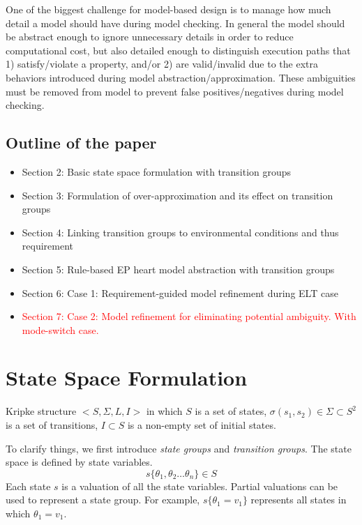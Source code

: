 \documentclass{llncs}
\begin{document}

One of the biggest challenge for model-based design is to manage how much detail a model should have during model checking. In general the model should be abstract enough to ignore unnecessary details in order to reduce computational cost, but also detailed enough to distinguish execution paths that 1) satisfy/violate a property, and/or 2) are valid/invalid due to the extra behaviors introduced during model abstraction/approximation. These ambiguities must be removed from model to prevent false positives/negatives during model checking. 

\subsection{Outline of the paper}
\begin{itemize}
	\item Section 2: Basic state space formulation with transition groups
    \item Section 3: Formulation of over-approximation and its effect on transition groups
    \item Section 4: Linking transition groups to environmental conditions and thus requirement
    \item Section 5: Rule-based EP heart model abstraction with transition groups
    \item Section 6: Case 1: Requirement-guided model refinement during ELT case 
    \item\textcolor{red}{ Section 7: Case 2: Model refinement for eliminating potential ambiguity. With mode-switch case.} 
\end{itemize}

%


\section{State Space Formulation}
Kripke structure $<S,\Sigma,L,I>$ in which $S$ is a set of states, $\sigma(s_1,s_2)\in\Sigma\subset S^2$ is a set of transitions, $I\subset S$ is a non-empty set of initial states.

To clarify things, we first introduce \emph{state groups} and \emph{transition groups}. The state space is defined by state variables. 
$$s\{\theta_1,\theta_2\dots \theta_n\}\in S$$
Each state $s$ is a valuation of all the state variables. Partial valuations can be used to represent a state group. For example, $s\{\theta_1=v_1\}$ represents all states in which $\theta_1=v_1$.
\end{document}
